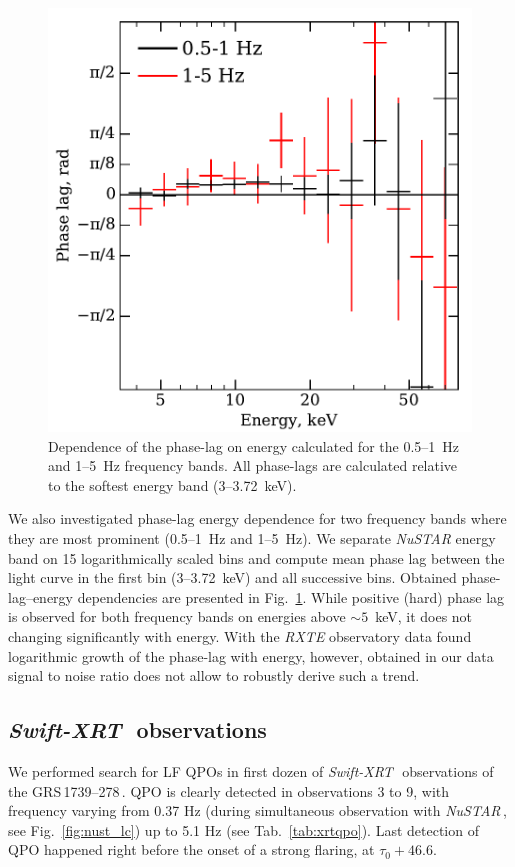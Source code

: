 \documentclass[a4paper,fleqn,usenatbib]{mnras}
\def\grs{{GRS\,1739--278\,}}
\def\swiftx{{\em Swift-XRT\,}}
\def\nustar{{\em NuSTAR\,}}
\begin{document}
\begin{figure}
    \includegraphics[width=\columnwidth]{phase_lag_en_dependence_2.pdf}
    \caption{Dependence of the phase-lag on energy calculated for the 0.5--1~Hz and 1--5~Hz frequency bands. All phase-lags are calculated relative to the softest energy band (3--3.72~keV).}
    \label{fig:ple}
\end{figure}

We also investigated phase-lag energy dependence for two frequency bands where they are most prominent (0.5--1~Hz and 1--5~Hz). 
We separate {\it NuSTAR} energy band on 15 logarithmically scaled bins and compute mean phase lag between the light curve in the first bin (3--3.72~keV) and all successive bins.
Obtained phase-lag--energy dependencies are presented in Fig.~\ref{fig:ple}.
While positive (hard) phase lag is observed for both frequency bands on energies above $\sim5$~keV, it does not changing significantly with energy. 
With the {\it RXTE} observatory data \citet{2001MNRAS.327..799K} found logarithmic growth of the phase-lag with energy, however, obtained in our data signal to noise ratio does not allow to robustly derive such a trend. 


\subsection{\swiftx\, observations}
We performed search for LF QPOs in first dozen of \swiftx\ observations of the \grs. 
QPO is clearly detected in observations 3 to 9, with frequency varying from 0.37 Hz (during simultaneous observation with \nustar, see Fig.~\ref{fig:nust_lc}) up to 5.1 Hz (see Tab.~\ref{tab:xrtqpo}). Last detection of QPO happened right before the onset of a strong flaring, at $\tau_{0}+46.6$. 
\end{document}

